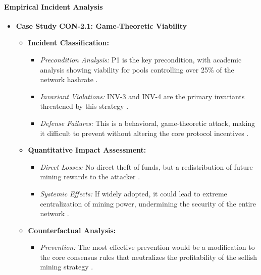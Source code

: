 \paragraph{Empirical Incident Analysis}

\begin{itemize}
    \item \textbf{Case Study CON-2.1: Game-Theoretic Viability}
    \begin{itemize}
        \item \textbf{Incident Classification:}
            \begin{itemize}
                \item \textit{Precondition Analysis:} P1 is the key precondition, with academic analysis showing viability for pools controlling over 25\% of the network hashrate \cite{Eyal2014}.
                \item \textit{Invariant Violations:} INV-3 and INV-4 are the primary invariants threatened by this strategy \cite{Eyal2014}.
                \item \textit{Defense Failures:} This is a behavioral, game-theoretic attack, making it difficult to prevent without altering the core protocol incentives \cite{Eyal2014, Wang2019}.
            \end{itemize}
        \item \textbf{Quantitative Impact Assessment:}
            \begin{itemize}
                \item \textit{Direct Losses:} No direct theft of funds, but a redistribution of future mining rewards to the attacker \cite{Eyal2014}.
                \item \textit{Systemic Effects:} If widely adopted, it could lead to extreme centralization of mining power, undermining the security of the entire network \cite{Eyal2014, Wang2019}.
            \end{itemize}
        \item \textbf{Counterfactual Analysis:}
            \begin{itemize}
                \item \textit{Prevention:} The most effective prevention would be a modification to the core consensus rules that neutralizes the profitability of the selfish mining strategy \cite{Eyal2014}.
            \end{itemize}
    \end{itemize}
\end{itemize}

